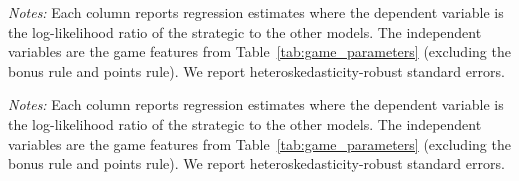 \newpage \clearpage

\begin{table}[h!] 
\begin{center}
\begin{minipage}{1 \linewidth}                          
\caption{Log-likelihood ratio regressions across game types ($\varepsilon = 0.05$)}  
\label{tab:game_level_eps_005}     
\centering                                                  
\scriptsize
\renewcommand{\arraystretch}{1.2}

\end{minipage}
\end{center}
\begin{footnotesize}
\begin{singlespace}
\vspace*{-0.15in}
\emph{Notes:} Each column reports regression estimates where the dependent variable is the log-likelihood ratio of the strategic \aisub{} to the other models.
The independent variables are the game features from Table~\ref{tab:game_parameters} (excluding the bonus rule and points rule).
We report heteroskedasticity-robust standard errors.
\starlanguage{}
\end{singlespace}
\end{footnotesize}
\end{table}

\begin{table}[h!] 
\begin{center}
\begin{minipage}{1 \linewidth}                          
\caption{Log-likelihood ratio regressions across game types ($\varepsilon = 0.1$)}  
\label{tab:game_level_eps_01}     
\centering                                                
\scriptsize
\renewcommand{\arraystretch}{1.2}

\end{minipage}
\end{center}
\begin{footnotesize}
\begin{singlespace}
\vspace*{-0.15in}
\emph{Notes:} Each column reports regression estimates where the dependent variable is the log-likelihood ratio of the strategic \aisub{} to the other models.
The independent variables are the game features from Table~\ref{tab:game_parameters} (excluding the bonus rule and points rule).
We report heteroskedasticity-robust standard errors.
\starlanguage{}
\end{singlespace}
\end{footnotesize}
\end{table}

